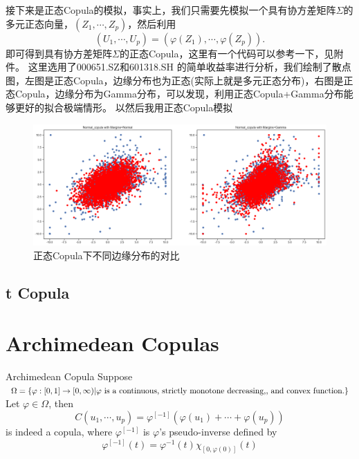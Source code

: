 \documentclass[12pt]{article}
\theoremstyle{definition}
\begin{document}
接下来是正态Copula的模拟，事实上，我们只需要先模拟一个具有协方差矩阵$\Sigma$的多元正态向量，$(Z_1,\cdots,Z_p)$，然后利用
$$
(U_1,\cdots,U_p) = (\varphi(Z_1),\cdots,\varphi(Z_p)).
$$
即可得到具有协方差矩阵$\Sigma$的正态Copula，这里有一个代码可以参考一下，见附件。
这里选用了000651.SZ和601318.SH	的简单收益率进行分析，我们绘制了散点图，左图是正态Copula，边缘分布也为正态(实际上就是多元正态分布)，右图是正态Copula，边缘分布为Gamma分布，可以发现，利用正态Copula+Gamma分布能够更好的拟合极端情形。
以然后我用正态Copula模拟

\begin{figure}[htb]
	\centering
	\includegraphics[scale=0.4]{figure/Copula_contrast.png}
	\caption{正态Copula下不同边缘分布的对比}
\end{figure}

\subsection{t Copula}
\section{Archimedean Copulas}
\begin{sdefinition}{Archimedean Copula}{}
Suppose $\Omega = \{\varphi:[0,1] \to [0,\infty) | \text{$\varphi$ is a continuous,
strictly monotone decreasing,} \\ \text{, and convex function.} \}$ Let $\varphi \in \Omega$, then 
$$
C(u_1,\cdots,u_p) = \varphi^{[-1]}(\varphi(u_1)+\cdots+\varphi(u_p))
$$
is indeed a copula, where  $\varphi^{[-1]}$ is $\varphi$'s pseudo-inverse defined by
$$
\varphi^{[-1]}(t) = \varphi^{-1}(t) \chi_{[0,\varphi(0)]}(t)
$$
\end{sdefinition}


 


%
%
\end{document}
